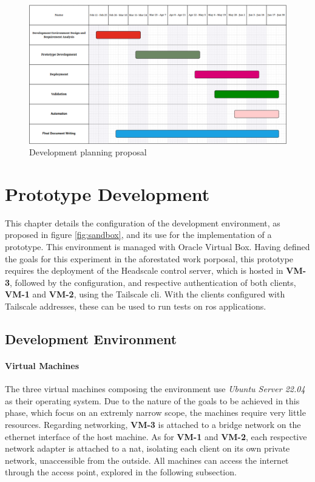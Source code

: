 \documentclass[11pt,twoside,a4paper]{report}
\begin{document}
\begin{figure}[h]
\centering
\includegraphics[width=1\textwidth]{gantt.png}
\caption{Development planning proposal}
\label{fig:gantt}
\end{figure}

\chapter{Prototype Development}

This chapter details the configuration of the development environment, as proposed in figure \ref{fig:sandbox}, and its use for the implementation of a prototype. This environment is managed with Oracle Virtual Box. Having defined the goals for this experiment in the aforestated work porposal, this prototype requires the deployment of the Headscale control server, which is hosted in \textbf{VM-3}, followed by the configuration, and respective authentication of both clients, \textbf{VM-1} and \textbf{VM-2}, using the Tailscale \ac{cli}. With the clients configured with Tailscale addresses, these can be used to run tests on \ac{ros} applications.

\section{Development Environment}

\subsubsection{Virtual Machines}

The three virtual machines composing the environment use \emph{Ubuntu Server 22.04} as their operating system. Due to the nature of the goals to be achieved in this phase, which focus on an extremly narrow scope, the machines require very little resources. Regarding networking, \textbf{VM-3} is attached to a bridge network on the ethernet interface of the host machine. As for \textbf{VM-1} and \textbf{VM-2}, each respective network adapter is attached to a \ac{nat}, isolating each client on its own private network, unaccessible from the outside. All machines can access the internet through the access point, explored in the following subsection.
\end{document}
